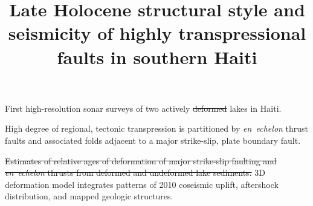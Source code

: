 \documentclass[linenumbers,draft]{agujournal}
\providecommand{\DIFadd}[1]{{\protect\color{blue}\uwave{#1}}} %
\providecommand{\DIFdel}[1]{{\protect\color{red}\sout{#1}}}                      %
\providecommand{\DIFaddbegin}{} %
\providecommand{\DIFaddend}{} %
\providecommand{\DIFdelbegin}{} %
\providecommand{\DIFdelend}{} %
\begin{document}
\title{Late Holocene structural style and seismicity of highly transpressional faults in southern Haiti}



\begin{keypoints}
\item First high-resolution sonar surveys of two actively \DIFdelbegin \DIFdel{deformed }\DIFdelend \DIFaddbegin \DIFadd{deforming }\DIFaddend lakes in Haiti.
\item High degree of regional, tectonic transpression is partitioned by \textit{en~echelon} thrust faults and associated folds adjacent to a major strike-slip, plate boundary fault.
\item \DIFdelbegin \DIFdel{Estimates of relative ages of deformation of major strike-slip faulting and \textit{en~echelon} thrusts from deformed and undeformed lake sediments.
}%
\DIFdelend 3D deformation model integrates patterns of 2010 coseismic uplift, aftershock distribution, and mapped geologic structures.
\end{keypoints}
\end{document}
